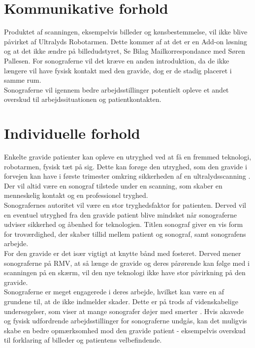 \section{Kommunikative forhold}
Produktet af scanningen, eksempelvis billeder og kønsbestemmelse, vil ikke blive påvirket af Ultralyds Robotarmen. Dette kommer af at det er en Add-on løsning og at det ikke ændre på billedudstyret, Se Bilag Mailkorrespondance med Søren Pallesen. 
For sonograferne vil det kræve en anden introduktion, da de ikke længere vil have fysisk kontakt med den gravide, dog er de stadig placeret i samme rum.  \\
Sonograferne vil igennem bedre arbejdsstillinger potentielt opleve et andet overskud til arbejdssituationen og patientkontakten.  

\section{Individuelle forhold}
Enkelte gravide patienter kan opleve en utryghed ved at få en fremmed teknologi, robotarmen, fysisk tæt på sig. Dette kan forøge den utryghed, som den gravide i forvejen kan have i første trimester omkring sikkerheden af en ultralydsscanning \cite{29}. Der vil altid være en sonograf tilstede under en scanning, som skaber en menneskelig kontakt og en professionel tryghed.  \\
Sonografernes autoritet vil være en stor tryghedsfaktor for patienten. Derved vil en eventuel utryghed fra den gravide patient blive mindsket når sonograferne udviser sikkerhed og åbenhed for teknologien. Titlen sonograf giver en vis form for troværdighed, der skaber tillid mellem patient og sonograf, samt sonografens arbejde.\\
For den gravide er det især vigtigt at knytte bånd med fosteret. Derved mener sonograferne på RMV, at så længe de gravide og deres pårørende kan følge med i scanningen på en skærm, vil den nye teknologi ikke have stor påvirkning på den gravide. \\  
Sonograferne er meget engagerede i deres arbejde, hvilket kan være en af grundene til, at de ikke indmelder skader. Dette er på trods af videnskabelige undersøgelser, som viser at mange sonografer døjer med smerter \cite{32}. 
Hvis akavede og fysisk udfordrende arbejdsstillinger for sonograferne undgås, kan det muligvis skabe en bedre opmærksomhed mod den gravide patient - eksempelvis overskud til forklaring af billeder og patientens velbefindende.  

